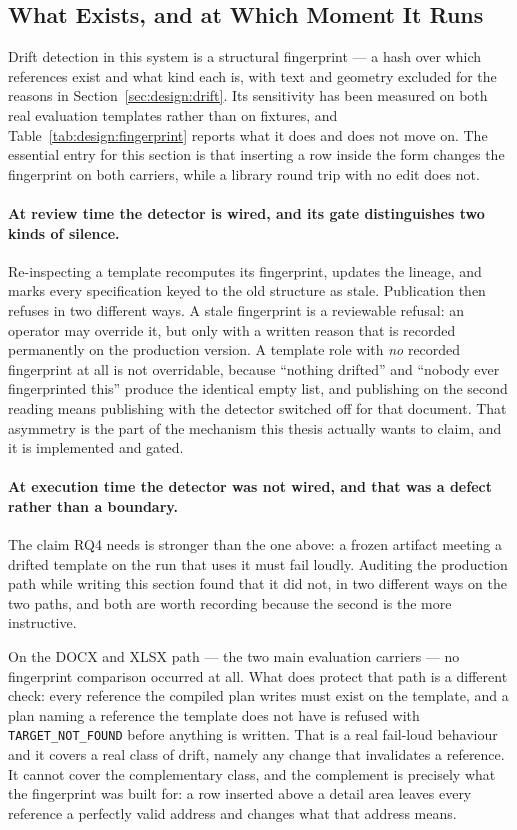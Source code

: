 \subsection{What Exists, and at Which Moment It Runs}

Drift detection in this system is a structural fingerprint --- a hash over which references
exist and what kind each is, with text and geometry excluded for the reasons in
Section~\ref{sec:design:drift}. Its sensitivity has been measured on both real evaluation
templates rather than on fixtures, and Table~\ref{tab:design:fingerprint} reports what it does
and does not move on. The essential entry for this section is that inserting a row inside the
form changes the fingerprint on both carriers, while a library round trip with no edit does
not.

\paragraph{At review time the detector is wired, and its gate distinguishes two kinds of
silence.}
Re-inspecting a template recomputes its fingerprint, updates the lineage, and marks every
specification keyed to the old structure as stale. Publication then refuses in two different
ways. A stale fingerprint is a reviewable refusal: an operator may override it, but only with
a written reason that is recorded permanently on the production version. A template role with
\emph{no} recorded fingerprint at all is not overridable, because ``nothing drifted'' and
``nobody ever fingerprinted this'' produce the identical empty list, and publishing on the
second reading means publishing with the detector switched off for that document. That
asymmetry is the part of the mechanism this thesis actually wants to claim, and it is
implemented and gated.

\paragraph{At execution time the detector was not wired, and that was a defect rather than a
boundary.}
The claim RQ4 needs is stronger than the one above: a frozen artifact meeting a drifted
template on the run that uses it must fail loudly. Auditing the production path while writing
this section found that it did not, in two different ways on the two paths, and both are worth
recording because the second is the more instructive.

On the DOCX and XLSX path --- the two main evaluation carriers --- no fingerprint comparison
occurred at all. What does protect that path is a different check: every reference the compiled
plan writes must exist on the template, and a plan naming a reference the template does not
have is refused with \texttt{TARGET\_NOT\_FOUND} before anything is written. That is a real
fail-loud behaviour and it covers a real class of drift, namely any change that invalidates a
reference. It cannot cover the complementary class, and the complement is precisely what the
fingerprint was built for: a row inserted above a detail area leaves every reference a
perfectly valid address and changes what that address means.

